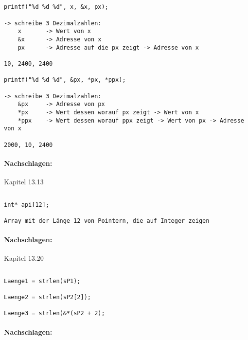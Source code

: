 \subsection{}
\begin{lstlisting}
printf("%d %d %d", x, &x, px);

-> schreibe 3 Dezimalzahlen:
	x 		-> Wert von x
	&x		-> Adresse von x
	px		-> Adresse auf die px zeigt -> Adresse von x
	
10, 2400, 2400

printf("%d %d %d", &px, *px, *ppx);

-> schreibe 3 Dezimalzahlen:
	&px 	-> Adresse von px
	*px		-> Wert dessen worauf px zeigt -> Wert von x
	*ppx	-> Wert dessen worauf ppx zeigt -> Wert von px -> Adresse von x
	
2000, 10, 2400
\end{lstlisting}
\paragraph*{Nachschlagen:}
Kapitel 13.13

\subsection{}
\begin{lstlisting}
int* api[12];

Array mit der Länge 12 von Pointern, die auf Integer zeigen 
\end{lstlisting}
\paragraph*{Nachschlagen:}
Kapitel 13.20

\subsection{}
\begin{lstlisting}
Laenge1 = strlen(sP1);

Laenge2	= strlen(sP2[2]);

Laenge3	= strlen(&*(sP2 + 2);
\end{lstlisting}
\paragraph*{Nachschlagen:}